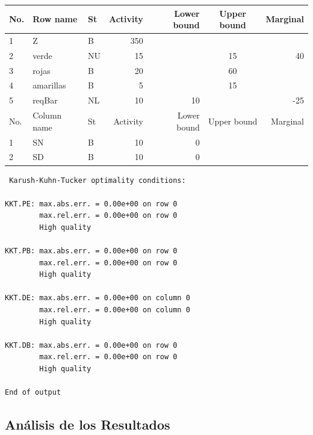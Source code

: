 \documentclass[a4paper,10pt]{article}
\begin{document}
\begin{center}
 
 \begin{tabular}{| l  l  l  r  r  c  r |}
  
    \hline
    No. &  	Row  name    &    St 	&     Activity &       Lower bound 	&     Upper bound	&      Marginal 	\\ \hline
    \hline
     1 	&	Z            &	B	&      350	&		    	&			&		\\                             
     2 	&	verde        &	NU      &	15	&                   	&       	15      & 	40	\\
     3 	&	rojas        &  B	&       20	&                   	&       	60 	&		\\
     4 	&	amarillas    &  B      &        5      &                   	& 		15 	&		\\
     5 	&	reqBar       &  NL     &       10      &      10           	&              	 	&	-25	\\ \hline
      \hline
    No.	& 	Column  name &    St 	&     Activity 	&       Lower bound 	&     Upper bound 	&      Marginal 	\\ \hline
    \hline
     1 &	SN           &	B	& 	10	&             0         &			&		\\      
     2 &	SD           &	B       &      10      &	      0          &			&		\\     
     \hline
 \end{tabular}
\end{center}

\begin{verbatim}
 Karush-Kuhn-Tucker optimality conditions:

KKT.PE: max.abs.err. = 0.00e+00 on row 0
        max.rel.err. = 0.00e+00 on row 0
        High quality

KKT.PB: max.abs.err. = 0.00e+00 on row 0
        max.rel.err. = 0.00e+00 on row 0
        High quality

KKT.DE: max.abs.err. = 0.00e+00 on column 0
        max.rel.err. = 0.00e+00 on column 0
        High quality

KKT.DB: max.abs.err. = 0.00e+00 on row 0
        max.rel.err. = 0.00e+00 on row 0
        High quality

End of output

\end{verbatim}



\subsection{An\'alisis de los Resultados}
\end{document}

